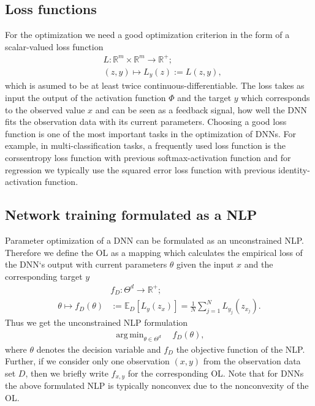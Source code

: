 \documentclass[conference]{IEEEtran}
\DeclareMathOperator*{\argmin}{arg\,min}
\begin{document}
	\subsection{Loss functions}
	For the optimization we need a good optimization criterion in the form of a scalar-valued loss function
	\begin{align}
	&L:\mathbb{R}^{m}\times \mathbb{R}^{m}\rightarrow \mathbb{R}^{+};\\
	&(z, y)\mapsto L_{y}(z) := L(z, y),
	\end{align}
	which is asumed to be at least twice continuous-differentiable. The loss takes as input the output of the activation function $\Phi$ and the target $y$ which corresponds to the observed value $x$ and can be seen as a feedback signal, how well the DNN fits the observation data with its current parameters. Choosing a good loss function is one of the most important tasks in the optimization of DNNs. For example, in multi-classification tasks, a frequently used loss function is the corssentropy loss function with previous softmax-activation function and for regression we typically use the squared error loss function with previous identity-activation function.
	
	\subsection{Network training formulated as a NLP}
	Parameter optimization of a DNN can be formulated as an unconstrained NLP. Therefore we define the OL as a mapping which calculates the empirical loss of the DNN`s output with current parameters $\theta$ given the input $x$ and the corresponding target $y$
	\begin{align}
	&f_{D}:\Theta^{d}\rightarrow\mathbb{R}^{+};\\
	\theta\mapsto f_{D}(\theta) &:= \mathbb{E}_{D}[L_{y}(z_{x})] =  \frac{1}{N}\sum_{j = 1}^{N}L_{y_{j}}(z_{x_{j}}).
	\end{align}
	Thus we get the unconstrained NLP formulation
	\begin{align}
	\argmin_{\theta\in\Theta^{d}}\quad f_{D}(\theta),
	\end{align}
	where $\theta$ denotes the decision variable and $f_{D}$ the objective function of the NLP.
	Further, if we consider only one observation $(x, y)$ from the observation data set $D$, then we briefly write  $f_{x, y}$ for the corresponding OL. Note that for DNNs the above formulated NLP is typically nonconvex due to the nonconvexity of the OL.
	
\end{document}
